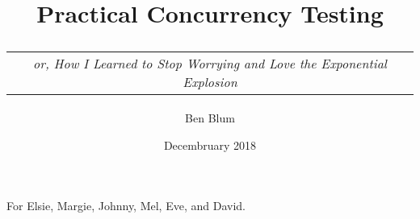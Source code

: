 \documentclass[12pt]{cmuthesis}
\begin{document}
\frontmatter

\pagestyle{empty}

\title{ %
{\bf Practical Concurrency Testing} \\
\normalsize \vspace{1em}
\begin{tabular}{c}
{\em or, How I Learned to Stop Worrying and Love the Exponential Explosion}
\end{tabular}}
\author{Ben Blum}
\date{Decembruary 2018}
\trnumber{}


\support{}
\disclaimer{}



\maketitle

\begin{dedication}
For Elsie, Margie, Johnny, Mel, Eve, and David.
\end{dedication}

\pagestyle{plain} %

\end{document}
